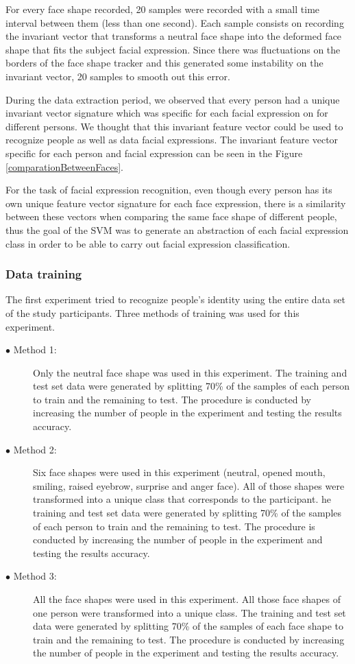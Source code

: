 \documentclass[]{article}
\begin{document}
For every face shape recorded, 20 samples were recorded with a small time
interval between them (less than one second). Each sample consists on recording
the invariant vector that transforms a neutral face shape into the deformed
face shape that fits the subject facial expression. Since there was fluctuations on the borders
of the face shape tracker and this generated some instability on the
invariant vector, 20 samples to smooth out this error.

During the data extraction period, we observed that every person had a unique invariant vector signature which was
specific for each facial expression on for different persons. We thought that this invariant feature vector could be
used to recognize people as well as data facial expressions. The invariant feature vector specific for each person and
facial expression can be seen in the Figure \ref{comparationBetweenFaces}.

For the task of facial expression recognition, even though every person has its own unique feature vector signature for
each face expression, there is a similarity between these vectors when comparing the same face shape of different
people, thus the goal of the SVM was to generate an abstraction of each facial expression class in order to be able to
carry out facial expression classification.

\subsubsection{Data training}

The first experiment tried to recognize people's identity using the entire data
set of the study participants. Three methods of training was used for this
experiment.
\begin{description}
\item[$\bullet$ Method 1:]Only the neutral face shape was used in this
experiment.  The training and test set data were generated by splitting 70\% of
the samples of each person to train and the remaining to test. The procedure is
conducted by increasing the number of people in the experiment and testing the 
results accuracy.
\item[$\bullet$ Method 2:]Six face shapes were used in this experiment (neutral,
opened mouth, smiling, raised eyebrow, surprise and anger face). All of those
shapes were transformed into a unique class that corresponds to the participant.
he training and test set data were generated by splitting 70\% of the samples of
each person to train and the remaining to test. The procedure is conducted by
increasing the number of people in the experiment and testing the results
accuracy.
\item[$\bullet$ Method 3:]All the face shapes were used in this experiment. All
those face shapes of one person were transformed into a unique class. The
training and test set data were generated by splitting 70\% of the samples of
each face shape to train and the remaining to test. The procedure is conducted
by increasing the number of people in the experiment and testing the results
accuracy.
\end{description}
\end{document}
